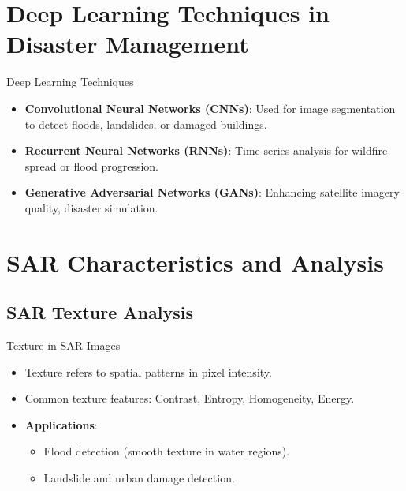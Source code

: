 \documentclass[10pt]{beamer}
\begin{document}
\section{Deep Learning Techniques in Disaster Management}
\begin{frame}{Deep Learning Techniques}
    \begin{itemize}
        \item \textbf{Convolutional Neural Networks (CNNs)}: Used for image segmentation to detect floods, landslides, or damaged buildings.
        \item \textbf{Recurrent Neural Networks (RNNs)}: Time-series analysis for wildfire spread or flood progression.
        \item \textbf{Generative Adversarial Networks (GANs)}: Enhancing satellite imagery quality, disaster simulation.
    \end{itemize}
\end{frame}

\section{SAR Characteristics and Analysis}
\subsection{SAR Texture Analysis}
\begin{frame}{Texture in SAR Images}
    \begin{itemize}
        \item Texture refers to spatial patterns in pixel intensity.
        \item Common texture features: Contrast, Entropy, Homogeneity, Energy.
        \item \textbf{Applications}: 
        \begin{itemize}
            \item Flood detection (smooth texture in water regions).
            \item Landslide and urban damage detection.
        \end{itemize}
    \end{itemize}
\end{frame}
\end{document}
